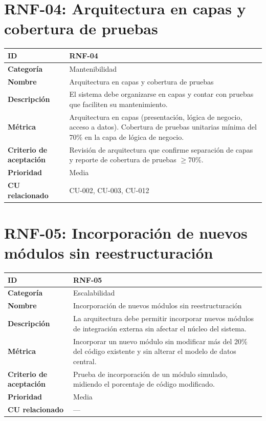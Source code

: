 \documentclass{article}
\begin{document}
\section*{RNF-04: Arquitectura en capas y cobertura de pruebas}
\begin{center}
\renewcommand{\arraystretch}{1.4}
\begin{tabular}{|L{4cm}|L{12cm}|}
\hline
\textbf{ID} & RNF-04 \\
\hline
\textbf{Categoría} & Mantenibilidad \\
\hline
\textbf{Nombre} & Arquitectura en capas y cobertura de pruebas \\
\hline
\textbf{Descripción} & El sistema debe organizarse en capas y contar con pruebas que faciliten su mantenimiento. \\
\hline
\textbf{Métrica} & Arquitectura en capas (presentación, lógica de negocio, acceso a datos). Cobertura de pruebas unitarias mínima del 70\% en la capa de lógica de negocio. \\
\hline
\textbf{Criterio de aceptación} & Revisión de arquitectura que confirme separación de capas y reporte de cobertura de pruebas $\geq$70\%. \\
\hline
\textbf{Prioridad} & Media \\
\hline
\textbf{CU relacionado} & CU-002, CU-003, CU-012 \\
\hline
\end{tabular}
\end{center}

\section*{RNF-05: Incorporación de nuevos módulos sin reestructuración}
\begin{center}
\renewcommand{\arraystretch}{1.4}
\begin{tabular}{|L{4cm}|L{12cm}|}
\hline
\textbf{ID} & RNF-05 \\
\hline
\textbf{Categoría} & Escalabilidad \\
\hline
\textbf{Nombre} & Incorporación de nuevos módulos sin reestructuración \\
\hline
\textbf{Descripción} & La arquitectura debe permitir incorporar nuevos módulos de integración externa sin afectar el núcleo del sistema. \\
\hline
\textbf{Métrica} & Incorporar un nuevo módulo sin modificar más del 20\% del código existente y sin alterar el modelo de datos central. \\
\hline
\textbf{Criterio de aceptación} & Prueba de incorporación de un módulo simulado, midiendo el porcentaje de código modificado. \\
\hline
\textbf{Prioridad} & Media \\
\hline
\textbf{CU relacionado} & --- \\
\hline
\end{tabular}
\end{center}
\end{document}
